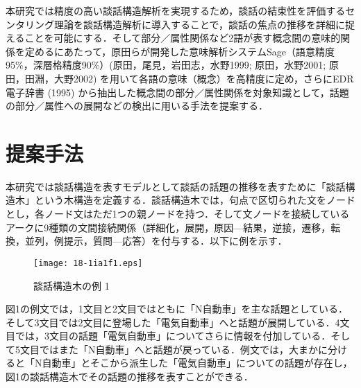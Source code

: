 \documentclass[japanese]{jnlp_1.4}
\begin{document}
本研究では精度の高い談話構造解析を実現するため，談話の結束性を評価するセンタリング理論を談話構造解析に導入することで，談話の焦点の推移を詳細に捉えることを可能にする．そして部分／属性関係など2語が表す概念間の意味的関係を定めるにあたって，原田らが開発した意味解析システムSage（語意精度95{\%}，深層格精度90{\%}）(原田，尾見，岩田志，水野1999; 原田，水野2001; 原田，田淵，大野2002) を用いて各語の意味（概念）を高精度に定め，さらにEDR電子辞書 (1995) から抽出した概念間の部分／属性関係を対象知識として，話題の部分／属性への展開などの検出に用いる手法を提案する．


\section{提案手法}
\label{sec:mylabel2}

本研究では談話構造を表すモデルとして談話の話題の推移を表すために「談話構造木」という木構造を定義する．談話構造木では，句点で区切られた文をノードとし，各ノード文はただ1つの親ノードを持つ．そして文ノードを接続しているアークに9種類の文間接続関係（詳細化，展開，原因—結果，逆接，遷移，転換，並列，例提示，質問—応答）を付与する．以下に例を示す．

\vspace{0.5\baselineskip}
\vspace{0.5\baselineskip}

\begin{figure}[t]
\begin{center}
\texttt{[image: 18-1ia1f1.eps]}
\end{center}
\caption{談話構造木の例 1}
\end{figure}


図1の例文では，1文目と2文目ではともに「N自動車」を主な話題としている．そして3文目では2文目に登場した「電気自動車」へと話題が展開している．4文目では，3文目の話題「電気自動車」についてさらに情報を付加している．そして5文目ではまた「N自動車」へと話題が戻っている．例文では，大まかに分けると「N自動車」とそこから派生した「電気自動車」についての話題が存在し，図1の談話構造木でその話題の推移を表すことができる．
\end{document}
